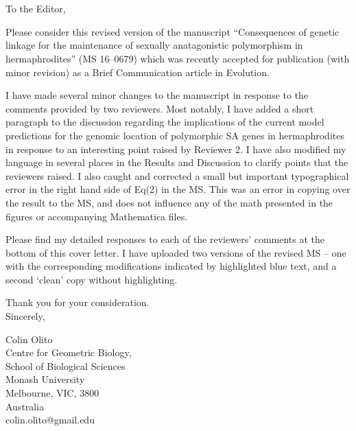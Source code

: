 \documentclass[11pt]{article}
\begin{document}




\section*{}
\noindent To the Editor,
\bigskip

Please consider this revised version of the manuscript “Consequences of genetic linkage for the maintenance of sexually anatagonistic polymorphism in hermaphrodites” (MS 16--0679) which was recently accepted for publication (with minor revision) as a Brief Communication article in Evolution.
\bigskip

I have made several minor changes to the manuscript in response to the comments provided by two reviewers. Most notably, I have added a short paragraph to the discussion regarding the implications of the current model predictions for the genomic location of polymorphic SA genes in hermaphrodites in response to an interesting point raised by Reviewer 2. I have also modified my language in several places in the Results and Discussion to clarify points that the reviewers raised. I also caught and corrected a small but important typographical error in the right hand side of Eq(2) in the MS. This was an error in copying over the result to the MS, and does not influence any of the math presented in the figures or accompanying Mathematica files. 
\bigskip

Please find my detailed responses to each of the reviewers' comments at the bottom of this cover letter. I have uploaded two versions of the revised MS -- one with the corresponding modifications indicated by highlighted blue text, and a second `clean' copy without highlighting.
\bigskip

\noindent Thank you for your consideration. \\
\noindent Sincerely,
\bigskip

\noindent Colin Olito \\
\noindent Centre for Geometric Biology, \\
\noindent School of Biological Sciences \\
\noindent Monash University \\
\noindent Melbourne, VIC, 3800 \\
\noindent Australia \\
\noindent colin.olito@gmail.edu \\
	
\end{document}

